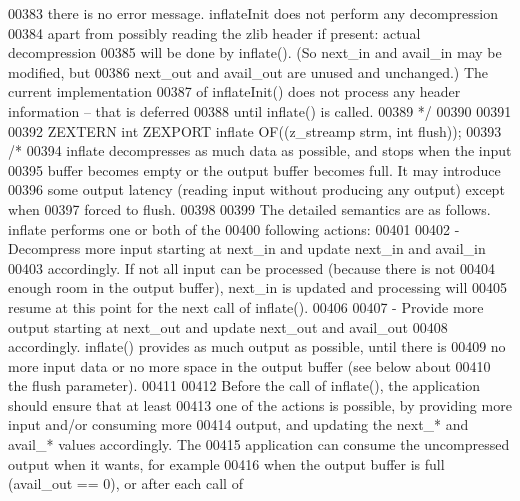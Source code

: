 \begin{DoxyCode}
00383 \textcolor{comment}{   there is no error message.  inflateInit does not perform any decompression}
00384 \textcolor{comment}{   apart from possibly reading the zlib header if present: actual decompression}
00385 \textcolor{comment}{   will be done by inflate().  (So next\_in and avail\_in may be modified, but}
00386 \textcolor{comment}{   next\_out and avail\_out are unused and unchanged.) The current implementation}
00387 \textcolor{comment}{   of inflateInit() does not process any header information -- that is deferred}
00388 \textcolor{comment}{   until inflate() is called.}
00389 \textcolor{comment}{*/}
00390 
00391 
00392 ZEXTERN \textcolor{keywordtype}{int} ZEXPORT inflate OF((z\_streamp strm, \textcolor{keywordtype}{int} flush));
00393 \textcolor{comment}{/*}
00394 \textcolor{comment}{    inflate decompresses as much data as possible, and stops when the input}
00395 \textcolor{comment}{  buffer becomes empty or the output buffer becomes full.  It may introduce}
00396 \textcolor{comment}{  some output latency (reading input without producing any output) except when}
00397 \textcolor{comment}{  forced to flush.}
00398 \textcolor{comment}{}
00399 \textcolor{comment}{  The detailed semantics are as follows.  inflate performs one or both of the}
00400 \textcolor{comment}{  following actions:}
00401 \textcolor{comment}{}
00402 \textcolor{comment}{  - Decompress more input starting at next\_in and update next\_in and avail\_in}
00403 \textcolor{comment}{    accordingly.  If not all input can be processed (because there is not}
00404 \textcolor{comment}{    enough room in the output buffer), next\_in is updated and processing will}
00405 \textcolor{comment}{    resume at this point for the next call of inflate().}
00406 \textcolor{comment}{}
00407 \textcolor{comment}{  - Provide more output starting at next\_out and update next\_out and avail\_out}
00408 \textcolor{comment}{    accordingly.  inflate() provides as much output as possible, until there is}
00409 \textcolor{comment}{    no more input data or no more space in the output buffer (see below about}
00410 \textcolor{comment}{    the flush parameter).}
00411 \textcolor{comment}{}
00412 \textcolor{comment}{    Before the call of inflate(), the application should ensure that at least}
00413 \textcolor{comment}{  one of the actions is possible, by providing more input and/or consuming more}
00414 \textcolor{comment}{  output, and updating the next\_* and avail\_* values accordingly.  The}
00415 \textcolor{comment}{  application can consume the uncompressed output when it wants, for example}
00416 \textcolor{comment}{  when the output buffer is full (avail\_out == 0), or after each call of}

\end{DoxyCode}
